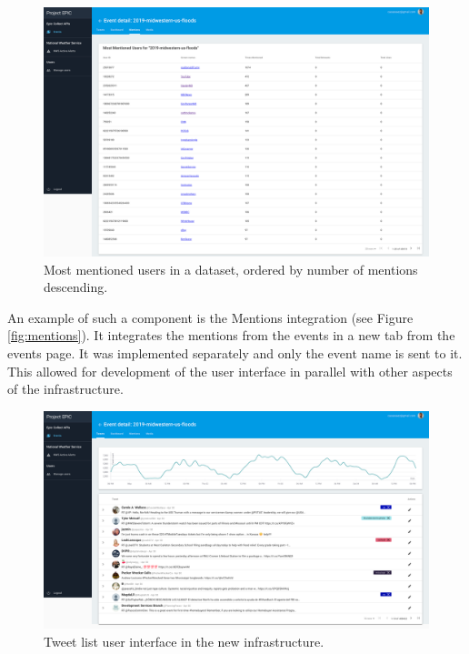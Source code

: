 \begin{figure}[htbp]
	\caption{\label{fig:mentions}
	Most mentioned users in a dataset, ordered by number of mentions descending.
	}
    \begin{center}
	\includegraphics[width=150mm]{figs/mentions.png}
    \end{center}
\label{xfigDiagram}
\end{figure}

An example of such a component is the Mentions integration (see Figure \ref{fig:mentions}). It integrates the mentions from the events in a new tab from the events page. It was implemented separately and only the event name is sent to it. This allowed for development of the user interface in parallel with other aspects of the infrastructure.

\begin{figure}[htbp]
	\caption{\label{fig:tweetlist}
	Tweet list user interface in the new infrastructure.
	}
    \begin{center}
	\includegraphics[width=150mm]{figs/tweet-list.png}
    \end{center}
\label{xfigDiagram}
\end{figure}

